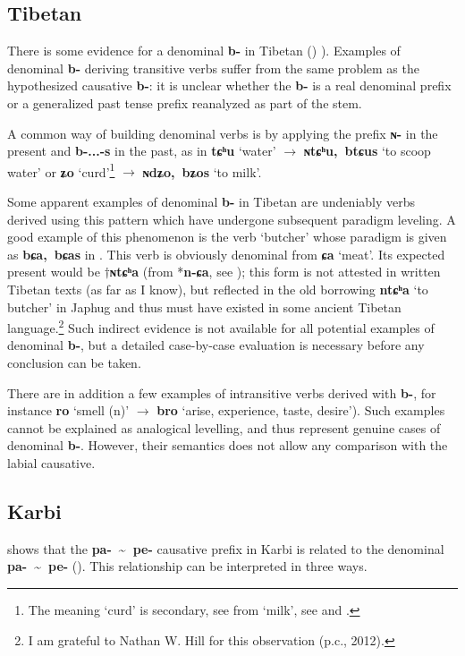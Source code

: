 \documentclass[oneside,a4paper,11pt]{article}
\newcommand{\ipa}[1]{\textbf{{\phon\mbox{#1}}}} %
\newcommand{\forme}[2]{\ipa{#1} `#2'}
\newcommand{\tld}{\textasciitilde{}}
\begin{document}
\subsection{Tibetan} \label{sec:tib.denom}
There is some evidence for a denominal \ipa{b-} in Tibetan (\citealt[100]{mazo04st}) \citealt[250-1]{zhang09cizu}). Examples of denominal \ipa{b-} deriving transitive verbs suffer from the same problem as the hypothesized causative \ipa{b-}: it is unclear whether the \ipa{b-} is a real denominal prefix or a generalized past tense prefix reanalyzed as part of the stem.

A common way of building denominal verbs is by applying the prefix \ipa{ɴ-} in the present and \ipa{b-...-s} in the past, as in \forme{tɕʰu}{water} $\rightarrow$ \forme{ɴtɕʰu, btɕus}{to scoop water} or \forme{ʑo}{curd}\footnote{The meaning `curd' is secondary, see from `milk', see \citet[29-30]{jacques14esquisse} and \citet{tournadre15chocha}.} $\rightarrow$ \forme{ɴdʑo, bʑos}{to milk}.

Some apparent examples of denominal \ipa{b-} in Tibetan are undeniably verbs derived using this pattern which have undergone subsequent paradigm leveling. A good example of this phenomenon is the verb `butcher' whose paradigm is given as \ipa{bɕa, bɕas} in \citet{bodrgya}. This verb is obviously denominal from \forme{ɕa}{meat}. Its expected present would be $\dagger$\ipa{ɴtɕʰa} (from *\ipa{n-ɕa}, see \citealt{lifk33}); this form is not attested in written Tibetan texts (as far as I know), but reflected in the old borrowing \forme{ntɕʰa}{to butcher} in Japhug and thus must have existed in some ancient Tibetan language.\footnote{I am grateful to Nathan W. Hill for this observation (p.c., 2012).} Such indirect evidence is not available for all potential examples of denominal \ipa{b-}, but a detailed case-by-case evaluation is necessary before any conclusion can be taken.

There are in addition a few examples of intransitive verbs derived with \ipa{b-}, for  instance \forme{ro}{smell (n)} $\rightarrow$ \forme{bro}{arise, experience, taste, desire}). Such examples cannot be explained as analogical levelling, and thus represent genuine cases of denominal \ipa{b-}. However, their semantics does not allow any comparison with the labial causative.


\subsection{Karbi} \label{sec:karbi.denom}
\citet[238]{konnerth14karbi} shows that the  \ipa{pa- \tld{} pe-} causative prefix in Karbi is related to the denominal  \ipa{pa- \tld{} pe-} (\citealt[205]{konnerth14karbi}). This relationship can be interpreted in three ways. 
\end{document}

